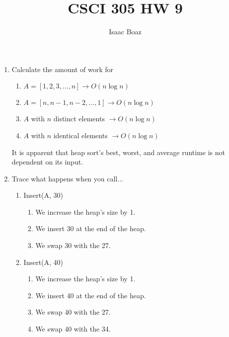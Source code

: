 \documentclass{article}
\title{\vspace{-2.5em}CSCI 305 HW 9}
\author{Isaac Boaz}
\begin{document}
\maketitle

\setlength{\columnseprule}{0.4pt}
\begin{enumerate}[label=\arabic*)]
      \item Calculate the amount of work for
            \begin{enumerate}[label=\alph*.]
                  \item \(A = [1, 2, 3, \dots, n] \rightarrow O(n \log n)\)
                  \item \(A = [n, n - 1, n - 2, \dots, 1] \rightarrow O(n \log n)\)
                  \item \(A\) with \(n\) distinct elements \(\rightarrow O(n \log n)\)
                  \item \(A\) with \(n\) identical elements \(\rightarrow O(n \log n)\)
            \end{enumerate}
            It is apparent that heap sort's best, worst, and average runtime is not dependent on its input.
      \item Trace what happens when you call...
            \begin{multicols}{2}
                  \begin{enumerate}[label=\alph*.]
                        \item Insert(A, 30)
                              \begin{enumerate}[label=\arabic*.]
                                    \item We increase the heap's size by 1.
                                    \item We insert 30 at the end of the heap.
                                    \item We swap 30 with the 27.
                              \end{enumerate}
                        \item Insert(A, 40)
                              \begin{enumerate}[label=\arabic*.]
                                    \item We increase the heap's size by 1.
                                    \item We insert 40 at the end of the heap.
                                    \item We swap 40 with the 27.
                                    \item We swap 40 with the 34.

\end{enumerate}
\end{enumerate}
\end{multicols}
\end{enumerate}
\end{document}
